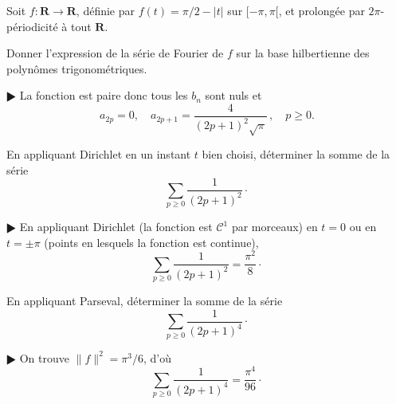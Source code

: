 \documentclass[11pt,a4paper]{article}
\def\R{\mathbf{R}}
\def\CC{\mathscr{C}}
\theoremstyle{plain}
\theoremstyle{definition}
\begin{document}
\begin{Exercice}[5 points]
Soit $f:\R \to \R$, d\'efinie par $f(t)=\pi/2-|t|$ sur $[-\pi,\pi[$, et prolong\'ee par
$2\pi$-p\'eriodicit\'e \`a tout $\R$.

\begin{Question} Donner l'expression de la s\'erie de Fourier de $f$
sur la base hilbertienne des polyn\^omes trigonom\'etriques.
\end{Question}

\begin{corr} $\RHD$ La fonction est paire donc tous les $b_n$ sont
nuls et
\[ a_{2p} = 0,\quad a_{2p+1} = \frac{4}{(2p+1)^2\sqrt{\pi}}\,,\quad p \geq 0. \]
\end{corr}

\begin{Question} En appliquant Dirichlet en un instant $t$ bien choisi,
d\'eterminer la somme de la s\'erie
\[ \sum_{p \geq 0} \frac{1}{(2p+1)^2} \cdot \] 
\end{Question}

\begin{corr} $\RHD$ En appliquant Dirichlet (la fonction est $\CC^1$ par morceaux)
en $t=0$ ou en $t=\pm\pi$ (points en lesquels la fonction est continue),
\[ \sum_{p \geq 0} \frac{1}{(2p+1)^2} = \frac{\pi^2}{8} \cdot \] 
\end{corr}

\begin{Question} En appliquant Parseval, d\'eterminer la somme de la s\'erie
\[ \sum_{p \geq 0} \frac{1}{(2p+1)^4} \cdot \]
\end{Question}

\begin{corr} $\RHD$ On trouve $\|f\|^2=\pi^3/6$, d'o\`u
\[ \sum_{p \geq 0} \frac{1}{(2p+1)^4} = \frac{\pi^4}{96} \cdot \]
\end{corr}

\end{Exercice} \vspace*{1em}
\end{document}
